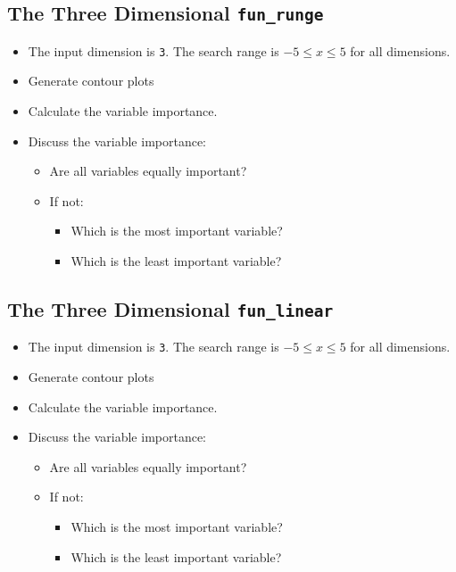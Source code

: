 \documentclass[
  letterpaper,
  DIV=11,
  numbers=noendperiod]{scrreprt}
\providecommand{\tightlist}{%
  \setlength{\itemsep}{0pt}\setlength{\parskip}{0pt}}\usepackage{longtable,booktabs,array}
\begin{document}
\subsection{\texorpdfstring{The Three Dimensional
\texttt{fun\_runge}}{The Three Dimensional fun\_runge}}\label{the-three-dimensional-fun_runge}

\begin{itemize}
\tightlist
\item
  The input dimension is \texttt{3}. The search range is
  \(-5 \leq x \leq 5\) for all dimensions.
\item
  Generate contour plots
\item
  Calculate the variable importance.
\item
  Discuss the variable importance:

  \begin{itemize}
  \tightlist
  \item
    Are all variables equally important?
  \item
    If not:

    \begin{itemize}
    \tightlist
    \item
      Which is the most important variable?
    \item
      Which is the least important variable?
    \end{itemize}
  \end{itemize}
\end{itemize}

\subsection{\texorpdfstring{The Three Dimensional
\texttt{fun\_linear}}{The Three Dimensional fun\_linear}}\label{the-three-dimensional-fun_linear}

\begin{itemize}
\tightlist
\item
  The input dimension is \texttt{3}. The search range is
  \(-5 \leq x \leq 5\) for all dimensions.
\item
  Generate contour plots
\item
  Calculate the variable importance.
\item
  Discuss the variable importance:

  \begin{itemize}
  \tightlist
  \item
    Are all variables equally important?
  \item
    If not:

    \begin{itemize}
    \tightlist
    \item
      Which is the most important variable?
    \item
      Which is the least important variable?
    \end{itemize}
  \end{itemize}
\end{itemize}
\end{document}
